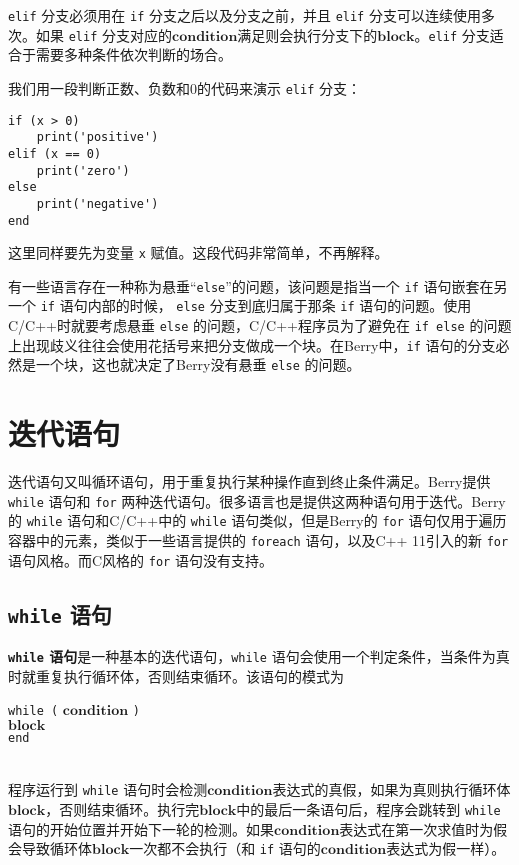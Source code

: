  \texttt{elif} 分支必须用在 \texttt{if} 分支之后以及分支之前，并且 \texttt{elif} 分支可以连续使用多次。如果 \texttt{elif} 分支对应的$\bm{condition}$满足则会执行分支下的$\bm{block}$。\texttt{elif} 分支适合于需要多种条件依次判断的场合。

我们用一段判断正数、负数和0的代码来演示 \texttt{elif} 分支：
\begin{lstlisting}[language=berry, numbers=none]
if (x > 0)
    print('positive')
elif (x == 0)
    print('zero')
else
    print('negative')
end
\end{lstlisting}
这里同样要先为变量 \texttt{x} 赋值。这段代码非常简单，不再解释。

有一些语言存在一种称为悬垂``\texttt{else}''的问题，该问题是指当一个 \texttt{if} 语句嵌套在另一个 \texttt{if} 语句内部的时候， \texttt{else} 分支到底归属于那条 \texttt{if} 语句的问题。使用C/C++时就要考虑悬垂 \texttt{else} 的问题，C/C++程序员为了避免在 \texttt{if else} 的问题上出现歧义往往会使用花括号来把分支做成一个块。在Berry中，\texttt{if} 语句的分支必然是一个块，这也就决定了Berry没有悬垂 \texttt{else} 的问题。

\section{迭代语句}

迭代语句又叫循环语句，用于重复执行某种操作直到终止条件满足。Berry提供 \texttt{while} 语句和 \texttt{for} 两种迭代语句。很多语言也是提供这两种语句用于迭代。Berry的 \texttt{while} 语句和C/C++中的 \texttt{while} 语句类似，但是Berry的 \texttt{for} 语句仅用于遍历容器中的元素，类似于一些语言提供的 \texttt{foreach} 语句，以及C++ 11引入的新 \texttt{for} 语句风格。而C风格的 \texttt{for} 语句没有支持。

\subsection{\texttt{while} 语句}

\textbf{\texttt{while} 语句}是一种基本的迭代语句，\texttt{while} 语句会使用一个判定条件，当条件为真时就重复执行循环体，否则结束循环。该语句的模式为
\begin{algorithm}
    \texttt{while (} $\bm{condition}$ \texttt{)} \\
        \qquad $\bm{block}$ \\
    \texttt{end}
\end{algorithm}\vspace{-0.6em}\\
程序运行到 \texttt{while} 语句时会检测$\bm{condition}$表达式的真假，如果为真则执行循环体$\bm{block}$，否则结束循环。执行完$\bm{block}$中的最后一条语句后，程序会跳转到 \texttt{while} 语句的开始位置并开始下一轮的检测。如果$\bm{condition}$表达式在第一次求值时为假会导致循环体$\bm{block}$一次都不会执行（和 \texttt{if} 语句的$\bm{condition}$表达式为假一样）。


